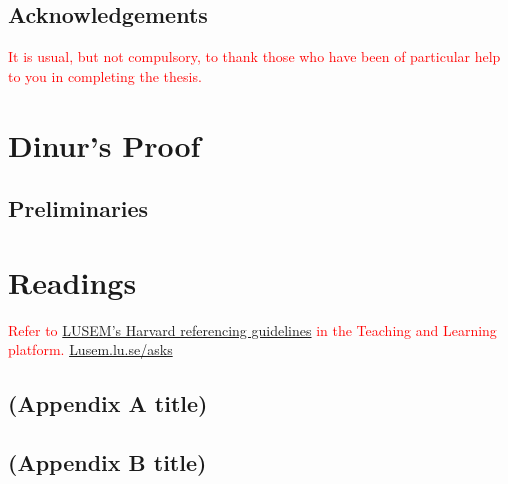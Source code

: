 \documentclass[12pt,twoside]{report}
\newcommand{\mcite}[1]{\textcolor{mycolor}{\citeauthor{#1} (\citeyear{#1})}}
\newcommand{\hcite}[1]{(\textcolor{mycolor}{\citeauthor{#1}, \citeyear{#1}})}
\begin{document}

    


    \chapter*{Acknowledgements}
    \textcolor{red}{It is usual, but not compulsory, to thank those who have been of particular help to you in completing the thesis.}

    {\hypersetup{linkcolor=black}
        \tableofcontents
        \listoffigures
        \listoftables
    }
        {\hypersetup{linkcolor=mycolor}}
     
    \part{Dinur's Proof}\label{prt:theory}
    
    \chapter{Preliminaries}
    

    \part{Readings}\label{prt:reading}
    
    
    
    \vspace{2.0cm}
    \textcolor{red}{Refer to \href{http://libguides.lub.lu.se/plagiarism}{LUSEM’s Harvard referencing guidelines} in the Teaching and Learning platform. \url{Lusem.lu.se/asks}}

    \appendix
    \chapter{(Appendix A title)}
    
     \chapter{(Appendix B title)}
\end{document}
